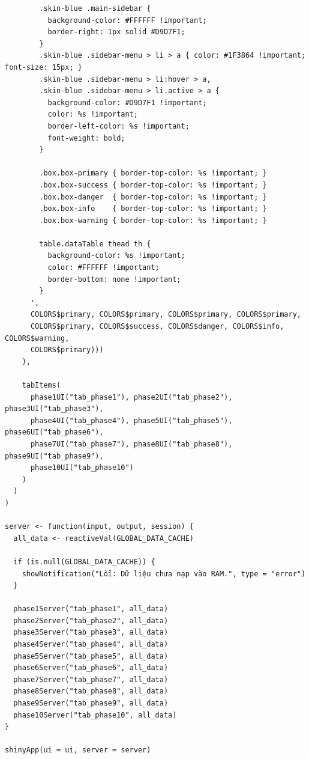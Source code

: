 \documentclass[12pt, a4paper]{article}
\begin{document}
\begin{lstlisting}
        .skin-blue .main-sidebar { 
          background-color: #FFFFFF !important; 
          border-right: 1px solid #D9D7F1; 
        }
        .skin-blue .sidebar-menu > li > a { color: #1F3864 !important; font-size: 15px; }
        .skin-blue .sidebar-menu > li:hover > a, 
        .skin-blue .sidebar-menu > li.active > a { 
          background-color: #D9D7F1 !important; 
          color: %s !important; 
          border-left-color: %s !important;
          font-weight: bold;
        }

        .box.box-primary { border-top-color: %s !important; }
        .box.box-success { border-top-color: %s !important; }
        .box.box-danger  { border-top-color: %s !important; }
        .box.box-info    { border-top-color: %s !important; }
        .box.box-warning { border-top-color: %s !important; }
        
        table.dataTable thead th {
          background-color: %s !important;
          color: #FFFFFF !important;
          border-bottom: none !important;
        }
      ', 
      COLORS$primary, COLORS$primary, COLORS$primary, COLORS$primary, 
      COLORS$primary, COLORS$success, COLORS$danger, COLORS$info, COLORS$warning,
      COLORS$primary)))
    ),
    
    tabItems(
      phase1UI("tab_phase1"), phase2UI("tab_phase2"), phase3UI("tab_phase3"),
      phase4UI("tab_phase4"), phase5UI("tab_phase5"), phase6UI("tab_phase6"),
      phase7UI("tab_phase7"), phase8UI("tab_phase8"), phase9UI("tab_phase9"),
      phase10UI("tab_phase10")
    )
  )
)

server <- function(input, output, session) {
  all_data <- reactiveVal(GLOBAL_DATA_CACHE)

  if (is.null(GLOBAL_DATA_CACHE)) {
    showNotification("Lỗi: Dữ liệu chưa nạp vào RAM.", type = "error")
  }
  
  phase1Server("tab_phase1", all_data)
  phase2Server("tab_phase2", all_data)
  phase3Server("tab_phase3", all_data)
  phase4Server("tab_phase4", all_data)
  phase5Server("tab_phase5", all_data)
  phase6Server("tab_phase6", all_data)
  phase7Server("tab_phase7", all_data)
  phase8Server("tab_phase8", all_data)
  phase9Server("tab_phase9", all_data)
  phase10Server("tab_phase10", all_data)
}

shinyApp(ui = ui, server = server)
\end{lstlisting}
\newpage
\end{document}
